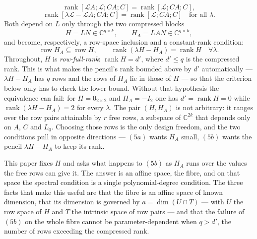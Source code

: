 \documentclass[journal]{IEEEtran}
\theoremstyle{plainn}
\theoremstyle{remark}
\begin{document}
\begin{equation}\label{eq:fivea}
\operatorname{rank}[\mathcal LA;\mathcal L;CA;C]=\operatorname{rank}[\mathcal L;CA;C],
\end{equation}
\begin{equation}\label{eq:fiveb}
\operatorname{rank}[\lambda\mathcal L-\mathcal LA;CA;C]=\operatorname{rank}[\mathcal L;CA;C]
\quad\text{for all }\lambda .
\end{equation}
Both depend on $L$ only through the two compressed blocks
\begin{equation}\label{eq:HHA}
H=LN\in\mathbb C^{q\times k},\qquad H_A=LAN\in\mathbb C^{q\times k},
\end{equation}
and become, respectively, a row-space inclusion and a constant-rank condition:
\begin{equation}\label{eq:compressed}
\operatorname{row}H_A\subseteq\operatorname{row}H,\qquad
\operatorname{rank}(\lambda H-H_A)=\operatorname{rank}H\quad\forall\lambda .
\end{equation}
Throughout, $H$ is \emph{row-full-rank}: $\operatorname{rank}H=d'$, where $d'\le q$ is the compressed
rank. This is what makes the pencil's rank bounded above by $d'$ automatically --- $\lambda H-H_A$ has
$q$ rows and the rows of $H_A$ lie in those of $H$ --- so that the criterion below only has to check the
lower bound. Without that hypothesis the equivalence can fail: for $H=0_{2\times2}$ and $H_A=-I_2$ one has
$d'=\operatorname{rank}H=0$ while $\operatorname{rank}(\lambda H-H_A)=2$ for every $\lambda$.
The pair $(H,H_A)$ is not arbitrary: it ranges over the row pairs attainable by $r$ free rows, a
subspace of $\mathbb C^{2k}$ that depends only on $A$, $C$ and $L_0$. Choosing those rows is the
only design freedom, and the two conditions pull in opposite directions --- $(5a)$ wants $H_A$
small, $(5b)$ wants the pencil $\lambda H-H_A$ to keep its rank.

This paper fixes $H$ and asks what happens to $(5b)$ as $H_A$ runs over the values the free rows can
give it. The answer is an affine space, the fibre, and on that space the spectral condition is a
single polynomial-degree condition. The three facts that make this useful are that the fibre is an
affine space of known dimension, that its dimension is governed by $a=\dim(U\cap T)$ --- with $U$ the
row space of $H$ and $T$ the intrinsic space of row pairs --- and that the failure of $(5b)$ on the
whole fibre cannot be parameter-dependent when $q>d'$, the number of rows exceeding the compressed
rank.
\end{document}
